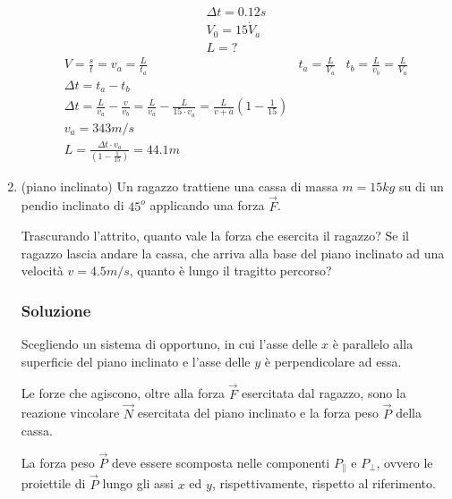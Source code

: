 \documentclass{report}
\begin{document}
\begin{enumerate}
  \begin{eqnarray*}
    \Delta t= 0.12s\\
    V_0=15\dot V_a\\
    L=?
  \end{eqnarray*}
  \begin{eqnarray*}
    V=\frac{s}{t}=v_a=\frac{L}{t_a} & t_a=\frac{L}{V_a} & t_b=\frac{L}{v_b}
                                                          =\frac{L}{V_a}\\
    \Delta t=t_a-t_b\\
    \Delta t=\frac{L}{v_a}-\frac{v}{v_b}=\frac{L}{v_a}-\frac{L}{15\cdot v_a}=\frac{L}{v+a}\left(1-\frac{1}{15}\right)\\
    v_a=343m/s\\
    L=\frac{\Delta t\cdot v_a}{\left(1-\frac{1}{15}\right)}= 44.1m
  \end{eqnarray*}
\item (piano inclinato) Un ragazzo trattiene una cassa di massa $m=15kg$ su di un pendio inclinato di
  $45^o$ applicando una forza $\vec{F}$.
  \begin{tasks}
  \task Trascurando l'attrito, quanto vale la forza che esercita il ragazzo?
  \task Se il ragazzo lascia andare la cassa, che arriva alla base del piano inclinato ad una velocità
    $v=4.5m/s$, quanto è lungo il tragitto percorso?
  \end{tasks}
  
\subsubsection{Soluzione}
\label{sec:sol15}
\begin{tasks}
  \task Scegliendo un sistema di opportuno, in cui l'asse delle $x$ è parallelo alla superficie del
  piano
inclinato e l'asse delle $y$ è perpendicolare ad essa.

Le forze che agiscono, oltre alla forza $\vec{F}$ esercitata dal ragazzo, sono la reazione vincolare
$\vec{N}$ esercitata del piano inclinato e la forza peso $\vec{P}$ della cassa.

La forza peso $\vec{P}$ deve essere scomposta nelle componenti $P_\parallel$ e $P_\bot$, ovvero le
proiettile di $\vec{P}$ lungo gli assi $x$ ed $y$, rispettivamente, rispetto al riferimento.


\end{tasks}
\end{enumerate}
\end{document}
